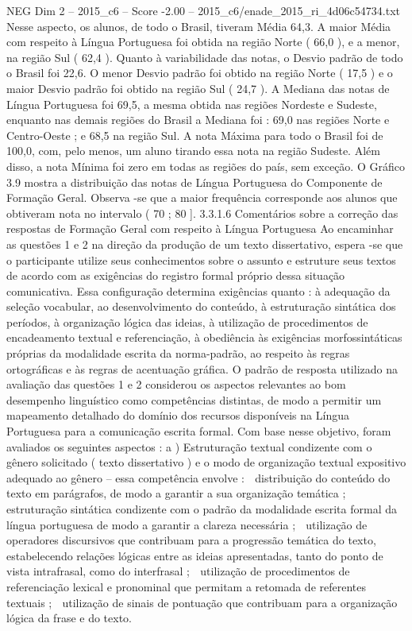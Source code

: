 \begin{textsample}{NEG Dim 2 – 2015\_c6 – Score -2.00 – 2015\_c6/enade\_2015\_ri\_4d06c54734.txt}
Nesse aspecto, os alunos, de todo o Brasil, tiveram Média 64,3.
A maior Média com respeito à Língua Portuguesa foi obtida na região Norte ( 66,0 ), e a menor, na região Sul ( 62,4 ).
Quanto à variabilidade das notas, o Desvio padrão de todo o Brasil foi 22,6.
O menor Desvio padrão foi obtido na região Norte ( 17,5 ) e o maior Desvio padrão foi obtido na região Sul ( 24,7 ).
A Mediana das notas de Língua Portuguesa foi 69,5, a mesma obtida nas regiões Nordeste e Sudeste, enquanto nas demais regiões do Brasil a Mediana foi : 69,0 nas regiões Norte e Centro-Oeste ; e 68,5 na região Sul.
A nota Máxima para todo o Brasil foi de 100,0, com, pelo menos, um aluno tirando essa nota na região Sudeste.
Além disso, a nota Mínima foi zero em todas as regiões do país, sem exceção.
O Gráfico 3.9 mostra a distribuição das notas de Língua Portuguesa do Componente de Formação Geral.
Observa -se que a maior frequência corresponde aos alunos que obtiveram nota no intervalo ( 70 ; 80 ]. 3.3.1.6 Comentários sobre a correção das respostas de Formação Geral com respeito à Língua Portuguesa Ao encaminhar as questões 1 e 2 na direção da produção de um texto dissertativo, espera -se que o participante utilize seus conhecimentos sobre o assunto e estruture seus textos de acordo com as exigências do registro formal próprio dessa situação comunicativa.
Essa configuração determina exigências quanto : à adequação da seleção vocabular, ao desenvolvimento do conteúdo, à estruturação sintática dos períodos, à organização lógica das ideias, à utilização de procedimentos de encadeamento textual e referenciação, à obediência às exigências morfossintáticas próprias da modalidade escrita da norma-padrão, ao respeito às regras ortográficas e às regras de acentuação gráfica.
O padrão de resposta utilizado na avaliação das questões 1 e 2 considerou os aspectos relevantes ao bom desempenho linguístico como competências distintas, de modo a permitir um mapeamento detalhado do domínio dos recursos disponíveis na Língua Portuguesa para a comunicação escrita formal.
Com base nesse objetivo, foram avaliados os seguintes aspectos : a ) Estruturação textual condizente com o gênero solicitado ( texto dissertativo ) e o modo de organização textual expositivo adequado ao gênero – essa competência envolve :  distribuição do conteúdo do texto em parágrafos, de modo a garantir a sua organização temática ;  estruturação sintática condizente com o padrão da modalidade escrita formal da língua portuguesa de modo a garantir a clareza necessária ;  utilização de operadores discursivos que contribuam para a progressão temática do texto, estabelecendo relações lógicas entre as ideias apresentadas, tanto do ponto de vista intrafrasal, como do interfrasal ;  utilização de procedimentos de referenciação lexical e pronominal que permitam a retomada de referentes textuais ;  utilização de sinais de pontuação que contribuam para a organização lógica da frase e do texto.

\end{textsample}
